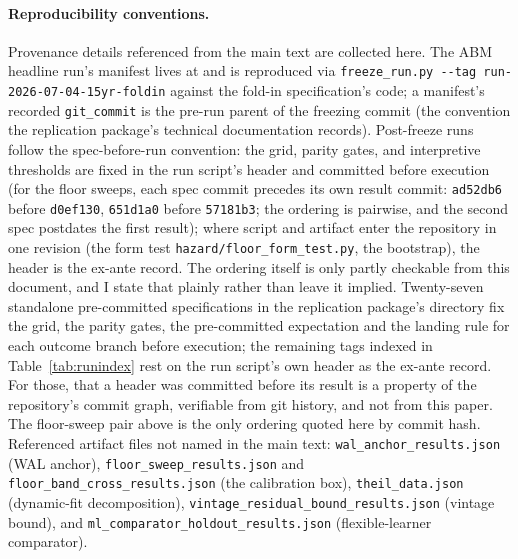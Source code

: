 \documentclass[12pt]{article}
\begin{document}
\paragraph{Reproducibility conventions.} Provenance details referenced from the main text are collected here. The ABM headline run's manifest lives at  and is reproduced via \texttt{freeze\_run.py -{}-tag run-2026-07-04-15yr-foldin} against the fold-in specification's code; a manifest's recorded \texttt{git\_commit} is the pre-run parent of the freezing commit (the convention the replication package's technical documentation records). Post-freeze runs follow the spec-before-run convention: the grid, parity gates, and interpretive thresholds are fixed in the run script's header and committed before execution (for the floor sweeps, each spec commit precedes its own result commit: \texttt{ad52db6} before \texttt{d0ef130}, \texttt{651d1a0} before \texttt{57181b3}; the ordering is pairwise, and the second spec postdates the first result); where script and artifact enter the repository in one revision (the form test \texttt{hazard/floor\_form\_test.py}, the bootstrap), the header is the ex-ante record. The ordering itself is only partly checkable from this document, and I state that plainly rather than leave it implied. Twenty-seven standalone pre-committed specifications in the replication package's  directory fix the grid, the parity gates, the pre-committed expectation and the landing rule for each outcome branch before execution; the remaining tags indexed in Table~\ref{tab:runindex} rest on the run script's own header as the ex-ante record. For those, that a header was committed before its result is a property of the repository's commit graph, verifiable from git history, and not from this paper. The floor-sweep pair above is the only ordering quoted here by commit hash. Referenced artifact files not named in the main text: \texttt{wal\_anchor\_results.json} (WAL anchor), \texttt{floor\_sweep\_results.json} and \texttt{floor\_band\_cross\_results.json} (the calibration box), \texttt{theil\_data.json} (dynamic-fit decomposition), \texttt{vintage\_residual\_bound\_results.json} (vintage bound), and \texttt{ml\_comparator\_holdout\_results.json} (flexible-learner comparator).
\end{document}
